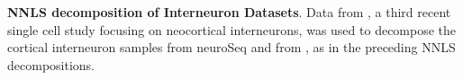\textbf{NNLS decomposition of Interneuron Datasets}. Data from \citep{Paul_2017}, a third recent single cell study focusing on neocortical interneurons, was used to decompose the cortical interneuron samples from neuroSeq and from \citep{Tasic_2018,Zeisel_2018}, as in the preceding NNLS decompositions.